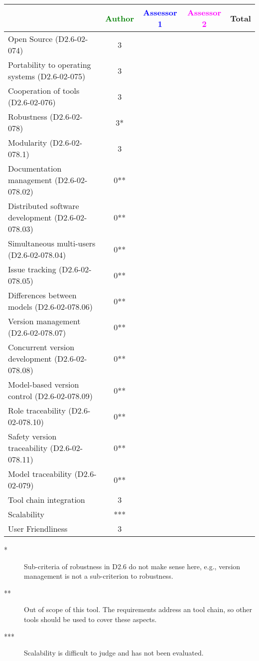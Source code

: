 \begin{tabular}{|l | c | c | c | c|}
\hline
& \textcolor{green}{Author} & \textcolor{blue}{Assessor 1} & \textcolor{magenta}{Assessor 2} & Total \\
\hline 
Open Source (D2.6-02-074) &3 & & &  \\
\hline 
Portability to operating systems (D2.6-02-075) &3 & & &  \\
\hline
Cooperation of tools (D2.6-02-076) &3 & & &  \\
\hline
Robustness (D2.6-02-078) &3* & & & \\
\hline
Modularity (D2.6-02-078.1) &3 & & & \\
\hline
Documentation management (D2.6-02-078.02) &0** & & & \\
\hline
Distributed software development (D2.6-02-078.03)  &0** & & & \\
\hline
Simultaneous multi-users (D2.6-02-078.04)   &0** & & & \\
\hline
Issue tracking (D2.6-02-078.05) &0** & & & \\
\hline
Differences between models (D2.6-02-078.06) &0** & & & \\
\hline
Version management (D2.6-02-078.07) &0** & & & \\
\hline
Concurrent version development (D2.6-02-078.08) &0** & & & \\
\hline
Model-based version control (D2.6-02-078.09) &0** & & & \\
\hline
Role traceability (D2.6-02-078.10) &0** & & & \\
\hline
Safety version traceability (D2.6-02-078.11) &0** & & & \\
\hline
Model traceability (D2.6-02-079) &0** & & & \\
\hline
Tool chain integration &3 & & & \\
\hline
Scalability &*** & & & \\
\hline
User Friendliness &3& & & \\
\hline
\end{tabular}

\begin{author_comment}
\begin{description}
\item[*] Sub-criteria of robustness in D2.6 do not make sense here, e.g., version management is not a sub-criterion to robustness.
\item[**] Out of scope of this tool. The requirements address an tool chain, so other tools should be used to cover these aspects.
\item[***] Scalability is difficult to judge and has not been evaluated.
\end{description}
\end{author_comment}

